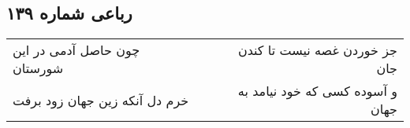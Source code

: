 \begin{center}
\section*{رباعی شماره ۱۳۹}
\label{sec:sh139}
\begin{longtable}{l p{0.5cm} r}
چون حاصل آدمی در این شورستان
&&
جز خوردن غصه نیست تا کندن جان
\\
خرم دل آنکه زین جهان زود برفت
&&
و آسوده کسی که خود نیامد به جهان
\\
\end{longtable}
\end{center}
